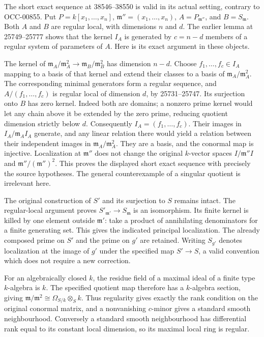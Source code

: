 The short exact sequence at 38546--38550 is valid in its actual setting, contrary to OCC-00855. Put \(P=k[x_1,\ldots,x_n]\), \(\mathfrak m''=(x_1,\ldots,x_n)\), \(A=P_{\mathfrak m''}\), and \(B=S_{\mathfrak m}\). Both \(A\) and \(B\) are regular local, with dimensions \(n\) and \(d\). The earlier lemma at 25749--25777 shows that the kernel \(I_A\) is generated by \(c=n-d\) members of a regular system of parameters of \(A\). Here is its exact argument in these objects.

The kernel of \(\mathfrak m_A/\mathfrak m_A^2\to\mathfrak m_B/\mathfrak m_B^2\) has dimension \(n-d\). Choose \(f_1,\ldots,f_c\in I_A\) mapping to a basis of that kernel and extend their classes to a basis of \(\mathfrak m_A/\mathfrak m_A^2\). The corresponding minimal generators form a regular sequence, and \(A/(f_1,\ldots,f_c)\) is regular local of dimension \(d\), by 25731--25747. Its surjection onto \(B\) has zero kernel. Indeed both are domains; a nonzero prime kernel would let any chain above it be extended by the zero prime, reducing quotient dimension strictly below \(d\). Consequently \(I_A=(f_1,\ldots,f_c)\). Their images in \(I_A/\mathfrak m_A I_A\) generate, and any linear relation there would yield a relation between their independent images in \(\mathfrak m_A/\mathfrak m_A^2\). They are a basis, and the conormal map is injective. Localization at \(\mathfrak m''\) does not change the original \(k\)-vector spaces \(I/\mathfrak m'' I\) and \(\mathfrak m''/(\mathfrak m'')^2\). This proves the displayed short exact sequence with precisely the source hypotheses. The general counterexample of a singular quotient is irrelevant here.

The original construction of \(S'\) and its surjection to \(S\) remains intact. The regular-local argument proves \(S'_{\mathfrak m'}\to S_{\mathfrak m}\) is an isomorphism. Its finite kernel is killed by one element outside \(\mathfrak m'\): take a product of annihilating denominators for a finite generating set. This gives the indicated principal localization. The already composed prime on \(S'\) and the prime on \(g'\) are retained. Writing \(S_{g'}\) denotes localization at the image of \(g'\) under the specified map \(S'\to S\), a valid convention which does not require a new correction.

For an algebraically closed \(k\), the residue field of a maximal ideal of a finite type \(k\)-algebra is \(k\). The specified quotient map therefore has a \(k\)-algebra section, giving \(\mathfrak m/\mathfrak m^2\cong\Omega_{S/k}\otimes_S k\). Thus regularity gives exactly the rank condition on the original conormal matrix, and a nonvanishing \(c\)-minor gives a standard smooth neighbourhood. Conversely a standard smooth neighbourhood has differential rank equal to its constant local dimension, so its maximal local ring is regular.


